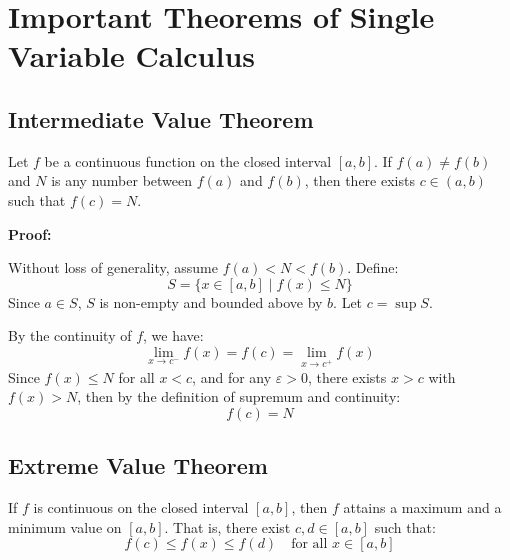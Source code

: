 \section{Important Theorems of Single Variable Calculus}

\subsection{Intermediate Value Theorem}

Let \( f \) be a continuous function on the closed interval \([a, b]\). If \( f(a) \ne f(b) \) and \( N \) is any number between \( f(a) \) and \( f(b) \), then there exists \( c \in (a, b) \) such that \( f(c) = N \).

\textbf{Proof:}  

Without loss of generality, assume \( f(a) < N < f(b) \).  
Define:
\[
S = \{ x \in [a, b] \mid f(x) \le N \}
\]
Since \( a \in S \), \( S \) is non-empty and bounded above by \( b \). Let \( c = \sup S \).

By the continuity of \( f \), we have:
\[
\lim_{x \to c^-} f(x) = f(c) = \lim_{x \to c^+} f(x)
\]
Since \( f(x) \le N \) for all \( x < c \), and for any \( \varepsilon > 0 \), there exists \( x > c \) with \( f(x) > N \), then by the definition of supremum and continuity:
\[
f(c) = N
\]

\QED

\begin{center}
\end{center}

\subsection{Extreme Value Theorem}

If \( f \) is continuous on the closed interval \([a, b] \), then \( f \) attains a maximum and a minimum value on \([a, b]\).  
That is, there exist \( c, d \in [a, b] \) such that:
\[
f(c) \le f(x) \le f(d) \quad \text{for all } x \in [a, b]
\]

